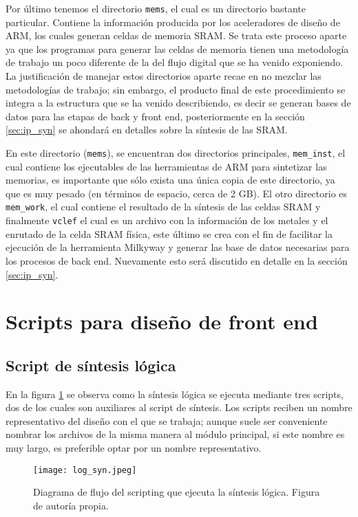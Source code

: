 Por último tenemos el directorio \texttt{mems}, el cual es un directorio bastante particular. Contiene la información producida por los aceleradores de diseño de ARM, los cuales generan celdas de memoria SRAM. Se trata este proceso aparte ya que los programas para generar las celdas de memoria tienen una metodología de trabajo un poco diferente de la del flujo digital que se ha venido exponiendo. La justificación de manejar estos directorios aparte recae en no mezclar las metodologías de trabajo; sin embargo, el producto final de este procedimiento se integra a la estructura que se ha venido describiendo, es decir se generan bases de datos para las etapas de back y front end, posteriormente en la sección \ref{sec:ip_syn} se ahondará en detalles sobre la síntesis de las SRAM.

En este directorio (\texttt{mems}), se encuentran dos directorios principales, \texttt{mem\_inst}, el cual contiene los ejecutables de las herramientas de ARM para sintetizar las memorias, es importante que sólo exista una única copia de este directorio, ya que es muy pesado (en términos de espacio, cerca de 2 GB). El otro directorio es \texttt{mem\_work}, el cual contiene el resultado de la síntesis de las celdas SRAM y finalmente \texttt{vclef} el cual es un archivo con la información de los metales y el enrutado de la celda SRAM física, este último se crea con el fin de facilitar la ejecución de la herramienta Milkyway y generar las base de datos necesarias para los procesos de back end. Nuevamente esto será discutido en detalle en la sección \ref{sec:ip_syn}.



\section{Scripts para diseño de front end}
\label{sec:syn_s}
\subsection{Script de síntesis lógica}
\label{script_syn}
En la figura \ref{s_syn} se observa como la síntesis lógica se ejecuta mediante tres scripts, dos de los cuales son auxiliares al script de síntesis. Los scripts reciben un nombre representativo del diseño con el que se trabaja; aunque suele ser conveniente nombrar los archivos de la misma manera al módulo principal, si este nombre es muy largo, es preferible optar por un nombre representativo.

\begin{figure}[h]
\texttt{[image: log\_syn.jpeg]}
\centering
\caption{Diagrama de flujo del scripting que ejecuta la síntesis lógica. Figura de autoría propia.}
\label{s_syn}
\end{figure}

